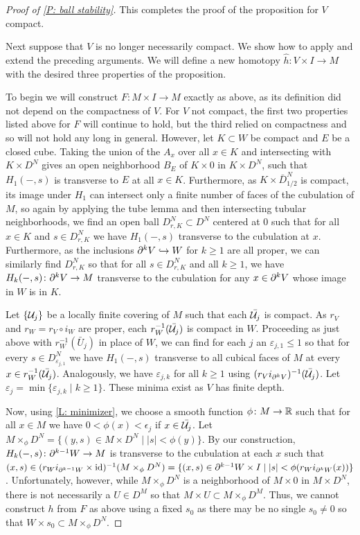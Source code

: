 \begin{proof}[Proof of \cref{P: ball stability}]
This completes the proof of the proposition for $V$ compact.


Next suppose that $V$ is no longer necessarily compact. We show how to apply and extend the preceding arguments. We will define a new homotopy $\hat h \colon V \times I \to M$ with the desired three properties of the proposition.

To begin we will construct $F \colon M \times I \to M$ exactly as above, as its definition did not depend on the compactness of $V$. For $V$ not compact, the first two properties listed above for $F$ will continue to hold, but the third relied on compactness and so will not hold any long in general. However, let
$K \subset W$ be compact and $E$ be a closed cube. Taking the union of the $A_x$ over all $x \in K$ and intersecting with $K \times D^N$ gives an open neighborhood $B_E$ of $K \times 0$ in $K \times D^N$, such that
 $H_1(-,s)$ is transverse to $E$ at all $x \in K$.
Furthermore, as $K \times \bar D^N_{1/2}$ is compact, its image under $H_1$ can intersect only a finite number of faces of the cubulation of $M$, so again by applying the tube lemma and then intersecting tubular neighborhoods, we find an open ball $D_{r,K}^N \subset D^N$ centered at $0$ such that for all $x \in K$ and $s \in D_{r,K}^N$ we have $H_1(-,s)$ transverse to the cubulation at $x$. Furthermore, as the inclusions $\partial^kV \hookrightarrow W$ for $k\geq 1$ are all proper, we can similarly find $D_{r,K}^N$ so that for all $s \in D_{r,K}^N$ and all $k\geq 1$, we have $H_k(-,s) \colon \partial^kV \to M$ transverse to the cubulation for any $x \in \partial^{k}V$ whose image in $W$ is in $K$.

 Let $\{\mathcal{U}_j\}$ be a locally finite covering of $M$ such that each $\bar{\mathcal{U}_j}$ is compact. As $r_V$ and $r_W = r_V \circ i_{W}$ are proper, each $r^{-1}_W(\bar {\mathcal{U}_j})$ is compact in $W$. Proceeding as just above with $r_W^{-1}(\bar U_j)$ in place of $W$, we can find for each $j$ an $\varepsilon_{j,1}\leq 1$ so that for every $s \in D^N_{\varepsilon_{j,1}}$ we have $H_1(-,s)$ transverse to all cubical faces of $M$ at every $x \in r^{-1}_W(\bar {\mathcal{U}_j})$. Analogously, we have $\varepsilon_{j,k}$ for all $k\geq 1$ using $(r_Vi_{\partial^kV})^{-1}(\bar {\mathcal{U}_j})$. Let $\varepsilon_j = \min\{\varepsilon_{j,k}\mid k\geq 1\}$. These minima exist as $V$ has finite depth.

Now, using \cref{L: minimizer}, we choose a smooth function $\phi \colon M \to \mathbb{R}$ such that for all $x \in M$ we have $0<\phi(x)<\epsilon_j$ if $x \in \bar{\mathcal{U}_j}$. Let $M\times_\phi D^N = \{(y,s) \in M \times D^N\mid |s|<\phi(y)\}$. By our construction, $H_k(-,s) \colon \partial^{k-1}W \to M$ is transverse to the cubulation at each $x$ such that $(x,s)\in(r_Wi_{\partial^{k-1}W} \times \mathrm{id})^{-1}(M\times_\phi D^N) = \{(x,s) \in \partial^{k-1}W \times I\mid |s|<\phi(r_Wi_{\partial^kW}(x))\}$. Unfortunately, however, while $M\times_\phi D^N$ is a neighborhood of $M \times 0$ in $M \times D^N$, there is not necessarily a $U \in D^M$ so that $M \times U \subset M\times_\phi D^M$. Thus,
we cannot construct $h$ from $F$ as above using a fixed $s_0$ as there may be no single $s_0\neq 0$ so that $W \times s_0 \subset M\times_\phi D^N$.



\end{proof}
